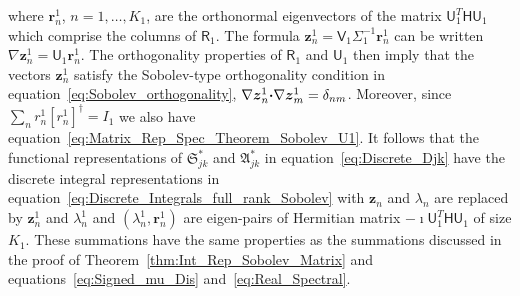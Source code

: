 \documentclass[english,12pt,jmp,graphicx]{revtex4-1}
\newcommand{\vecu}{\boldsymbol{u}}
\newcommand{\vecz}{\boldsymbol{z}}
\newcommand{\thmref}[1]{Theorem~\ref{#1}}
\newcommand{\secref}[1]{Section~\ref{#1}}
\newcommand{\bcdot}{\mbox{\boldmath${\cdot}$}}
\newcommand{\Sg}{\mathfrak{S}}
\newcommand{\Ag}{\mathfrak{A}}
\renewcommand{\d}{\mathrm{d}}
\newcommand{\vecchi}{\boldsymbol{\chi}}
\newcommand{\vecr}{\boldsymbol{r}}
\newcommand{\Hm}{\mathsf{H}}
\newcommand{\Um}{\mathsf{U}}
\newcommand{\Vm}{\mathsf{V}}
\newcommand{\Rm}{\mathsf{R}}
\begin{document}
where $\vecr_n^1$, $n=1,\ldots,K_1$, are the orthonormal eigenvectors of
the matrix $\Um_1^T\Hm\Um_1$ which comprise the columns of
$\Rm_1$.
The formula $\vecz_n^1=\Vm_1\Sigma_1^{-1}\vecr_n^1$ can be written
$\nabla\vecz_n^1=\Um_1\vecr_n^1$.
The orthogonality properties of $\Rm_1$ and $\Um_1$
then imply that the vectors 
$\vecz_n^1$ satisfy the Sobolev-type orthogonality condition in 
equation~\eqref{eq:Sobolev_orthogonality},
$\nabla\vecz^1_n\bcdot\nabla\vecz^1_m=\delta_{nm}$. Moreover, since
$\sum_nr_n^1[r_n^1]^\dagger=I_1$
we also have 
equation~\eqref{eq:Matrix_Rep_Spec_Theorem_Sobolev_U1}.
It follows
that the functional representations of
$\Sg^*_{jk}$ and $\Ag^*_{jk}$ in equation~\eqref{eq:Discrete_Djk}
have the discrete integral representations in
equation~\eqref{eq:Discrete_Integrals_full_rank_Sobolev} 
with $\vecz_n$ and $\lambda_n$ are replaced by
$\vecz_n^1$ and $\lambda^1_n$ and $(\lambda^1_n,\vecr_n^1)$ are
eigen-pairs of Hermitian matrix $-\imath\Um_1^T\Hm\Um_1$ of size
$K_1$. These summations have the same 
properties as the summations discussed in the proof of
\thmref{thm:Int_Rep_Sobolev_Matrix} and
equations~\eqref{eq:Signed_mu_Dis} and~\eqref{eq:Real_Spectral}.    
\end{document}
